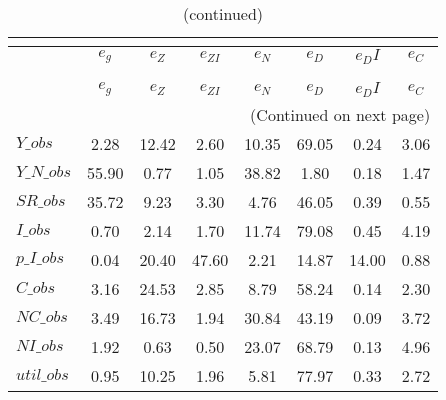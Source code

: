  
\begin{center}
\begin{longtable}{lccccccc} 
\caption{VARIANCE DECOMPOSITION (in percent)}\\
 \label{Table:th_var_decomp_uncond}\\
\toprule 
$           $	 & 	 $       {e_g}$	 & 	 $       {e_Z}$	 & 	 $    {e_{ZI}}$	 & 	 $       {e_N}$	 & 	 $       {e_D}$	 & 	 $      {e_DI}$	 & 	 $       {e_C}$\\
\midrule \endfirsthead 
\caption{(continued)}\\
 \toprule \\ 
$           $	 & 	 $       {e_g}$	 & 	 $       {e_Z}$	 & 	 $    {e_{ZI}}$	 & 	 $       {e_N}$	 & 	 $       {e_D}$	 & 	 $      {e_DI}$	 & 	 $       {e_C}$\\
\midrule \endhead 
\midrule \multicolumn{8}{r}{(Continued on next page)} \\ \bottomrule \endfoot 
\bottomrule \endlastfoot 
$Y\_obs     $	 & 	        2.28	 & 	       12.42	 & 	        2.60	 & 	       10.35	 & 	       69.05	 & 	        0.24	 & 	        3.06 \\ 
$Y\_N\_obs  $	 & 	       55.90	 & 	        0.77	 & 	        1.05	 & 	       38.82	 & 	        1.80	 & 	        0.18	 & 	        1.47 \\ 
$SR\_obs    $	 & 	       35.72	 & 	        9.23	 & 	        3.30	 & 	        4.76	 & 	       46.05	 & 	        0.39	 & 	        0.55 \\ 
$I\_obs     $	 & 	        0.70	 & 	        2.14	 & 	        1.70	 & 	       11.74	 & 	       79.08	 & 	        0.45	 & 	        4.19 \\ 
$p\_I\_obs  $	 & 	        0.04	 & 	       20.40	 & 	       47.60	 & 	        2.21	 & 	       14.87	 & 	       14.00	 & 	        0.88 \\ 
$C\_obs     $	 & 	        3.16	 & 	       24.53	 & 	        2.85	 & 	        8.79	 & 	       58.24	 & 	        0.14	 & 	        2.30 \\ 
$NC\_obs    $	 & 	        3.49	 & 	       16.73	 & 	        1.94	 & 	       30.84	 & 	       43.19	 & 	        0.09	 & 	        3.72 \\ 
$NI\_obs    $	 & 	        1.92	 & 	        0.63	 & 	        0.50	 & 	       23.07	 & 	       68.79	 & 	        0.13	 & 	        4.96 \\ 
$util\_obs  $	 & 	        0.95	 & 	       10.25	 & 	        1.96	 & 	        5.81	 & 	       77.97	 & 	        0.33	 & 	        2.72 \\ 

\end{longtable}
\end{center}
